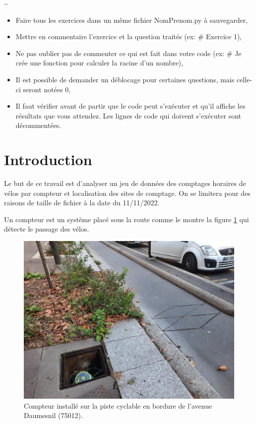 


\usepackage{enumitem}







\begin{center}
{\Large\bf {\type} \no {\numero} -- \descrip}
\end{center}


\begin{boxedminipage}{.9\textwidth} 
\begin{itemize}
 \item Faire tous les exercices dans un même fichier {NomPrenom.py} à sauvegarder,
 \item Mettre en commentaire l'exercice et la question traités (ex: \# Exercice 1),
 \item Ne pas oublier pas de commenter ce qui est fait dans votre code (ex: \# Je crée une fonction pour calculer la racine d'un nombre),
 \item Il est possible de demander un déblocage pour certaines questions, mais celle-ci seront notées 0,
 \item Il faut vérifier avant de partir que le code peut s'exécuter et qu'il affiche les résultats que vous attendez. Les lignes de code qui doivent s'exécuter sont décommentées.
\end{itemize}
\end{boxedminipage}

\section*{Introduction}

Le but de ce travail est d'analyser un jeu de données des comptages horaires de vélos par compteur et localisation des sites de comptage. On se limitera pour des raisons de taille de fichier à la date du 11/11/2022.

Un compteur est un système placé sous la route comme le montre la figure \ref{img01} qui détecte le passage des vélos.

\begin{figure}[!ht]
\begin{center}
	\includegraphics[width=0.5\linewidth]{img/compteur_daumesnil}
	\caption{Compteur installé sur la piste cyclable en bordure de l'avenue Daumesnil (75012).}
	\label{img01}
\end{center}
\end{figure}

